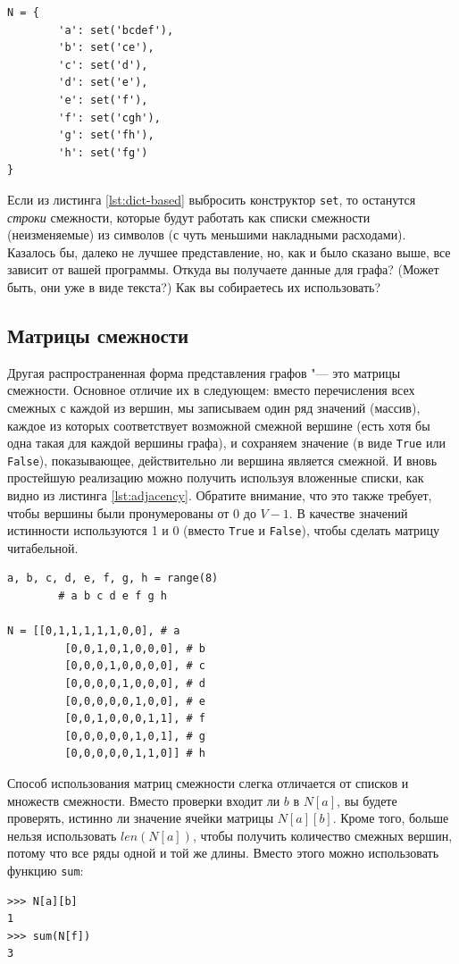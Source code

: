 \begin{lstlisting}[caption={Словарь с множествами смежности}, label={lst:dict-based}]
N = {
		'a': set('bcdef'),
		'b': set('ce'),
		'c': set('d'),
		'd': set('e'),
		'e': set('f'),
		'f': set('cgh'),
		'g': set('fh'),
		'h': set('fg')
}
\end{lstlisting}

\begin{note}
Если из листинга \ref{lst:dict-based} выбросить конструктор \texttt{set}, то останутся \textit{строки} смежности, которые будут работать как списки смежности (неизменяемые) из символов (с чуть меньшими накладными расходами). Казалось бы, далеко не лучшее представление, но, как и было сказано выше, все зависит от вашей программы. Откуда вы получаете данные для графа? (Может быть, они уже в виде текста?) Как вы собираетесь их использовать?
\end{note}

\subsection{Матрицы смежности}
\label{sec:adjacency-matrix}

Другая распространенная форма представления графов "--- это матрицы смежности. Основное отличие их в следующем: вместо перечисления всех смежных с каждой из вершин, мы записываем один ряд значений (массив), каждое из которых соответствует возможной смежной вершине (есть хотя бы одна такая для каждой вершины графа), и сохраняем значение (в виде \texttt{True} или \texttt{False}), показывающее, действительно ли вершина является смежной. И вновь простейшую реализацию можно получить используя вложенные списки, как видно из листинга \ref{lst:adjacency}. Обратите внимание, что это также требует, чтобы вершины были пронумерованы от $0$ до $V-1$. В качестве значений истинности используются 1 и 0 (вместо \texttt{True} и \texttt{False}), чтобы сделать матрицу читабельной.

\begin{lstlisting}[caption={Матрица смежности, реализованная с помощью вложенных списков},label={lst:adjacency}]
a, b, c, d, e, f, g, h = range(8)
	    # a b c d e f g h

N = [[0,1,1,1,1,1,0,0], # a
		 [0,0,1,0,1,0,0,0], # b
		 [0,0,0,1,0,0,0,0], # c
		 [0,0,0,0,1,0,0,0], # d
		 [0,0,0,0,0,1,0,0], # e
		 [0,0,1,0,0,0,1,1], # f
		 [0,0,0,0,0,1,0,1], # g
		 [0,0,0,0,0,1,1,0]] # h
\end{lstlisting}

Способ использования матриц смежности слегка отличается от списков и множеств смежности. Вместо проверки входит ли $b$ в $N[a]$, вы будете проверять, истинно ли значение ячейки матрицы $N[a][b]$. Кроме того, больше нельзя использовать $len(N[a])$, чтобы получить количество смежных вершин, потому что все ряды одной и той же длины. Вместо этого можно использовать функцию \texttt{sum}:
\begin{lstlisting}
>>> N[a][b]
1
>>> sum(N[f])
3
\end{lstlisting}

